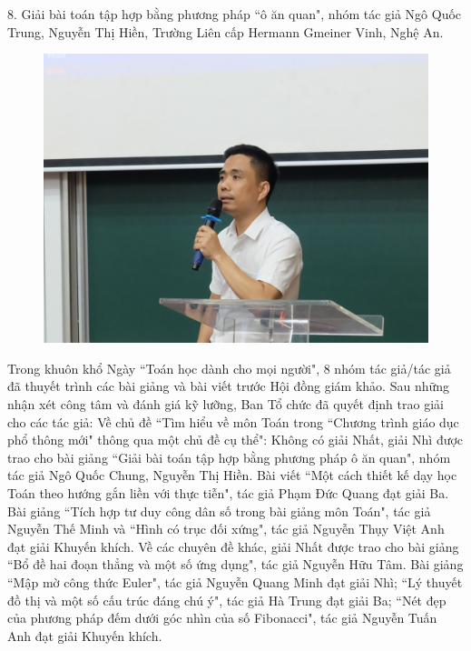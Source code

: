\begin{multicols}{2}
\begin{figure}[H]
		\vspace*{-15pt}
	\end{figure}
	$8$. Giải bài toán tập hợp bằng phương pháp ``ô ăn quan", nhóm tác giả Ngô Quốc Trung, Nguyễn Thị Hiền, Trường Liên cấp Hermann Gmeiner Vinh, Nghệ An. 
	\begin{figure}[H]
		\vspace*{-5pt}
		\centering
		\captionsetup{labelformat= empty, justification=centering}
		\includegraphics[width= 1\linewidth]{9}
		\vspace*{-15pt}
	\end{figure}
	Trong khuôn khổ Ngày ``Toán học dành cho mọi người", $8$ nhóm tác giả/tác giả đã thuyết trình các bài giảng và bài viết trước Hội đồng giám khảo. Sau những nhận xét công tâm và đánh giá kỹ lưỡng, Ban Tổ chức đã quyết định trao giải cho các tác giả:
	\vskip 0.1cm
	Về chủ đề ``Tìm hiểu về môn Toán trong ``Chương trình giáo dục phổ thông mới" thông qua một chủ đề cụ thể": Không có giải Nhất, giải Nhì được trao cho bài giảng ``Giải bài toán tập hợp bằng phương pháp ô ăn quan", nhóm tác giả Ngô Quốc Chung, Nguyễn Thị Hiền. Bài viết ``Một cách thiết kế dạy học Toán theo hướng gắn liền với thực tiễn", tác giả Phạm Đức Quang đạt giải Ba. Bài giảng ``Tích hợp tư duy công dân số trong bài giảng môn Toán", tác giả Nguyễn Thế Minh và ``Hình có trục đối xứng", tác giả Nguyễn Thụy Việt Anh đạt giải Khuyến khích. 
	\vskip 0.1cm
	Về các chuyên đề khác, giải Nhất được trao cho bài giảng ``Bổ đề hai đoạn thẳng và một số ứng dụng", tác giả Nguyễn Hữu Tâm. Bài giảng ``Mập mờ công thức Euler", tác giả Nguyễn Quang Minh đạt giải Nhì; ``Lý thuyết đồ thị và một số cấu trúc đáng chú ý", tác giả Hà Trung đạt giải Ba; ``Nét đẹp của phương pháp đếm dưới góc nhìn của số Fibonacci", tác giả Nguyễn Tuấn Anh đạt giải Khuyến khích. 
	\end{multicols}
